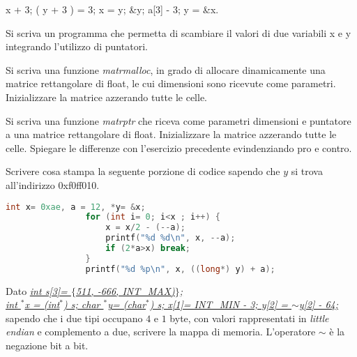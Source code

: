 \documentclass[addpoints,11pt]{exam}
\begin{document}
\begin{questions}
		\begin{oneparcheckboxes}
			\choice x + 3;
			\choice *( y + 3 ) = 3;
			\choice *x = y;
			\choice \&y;
			\choice a[3] - 3;
			\choice y = \&x.
		\end{oneparcheckboxes}
		
		
		
		\question [1]Si scriva un programma che permetta di scambiare il valori di due variabili x e y integrando l'utilizzo di puntatori.
		\makeemptybox{100pt}
		
		
		
		\question[2] Si scriva una funzione \emph{matrmalloc}, in grado di allocare dinamicamente una matrice rettangolare di float, le cui dimensioni sono ricevute come parametri. Inizializzare la matrice azzerando tutte le celle.
		\makeemptybox{100pt}
		
		
		
		\question[4] Si scriva una funzione \emph{matrptr} che riceva come parametri dimensioni e puntatore a una matrice rettangolare di float. Inizializzare la matrice azzerando tutte le celle. Spiegare le differenze con l'esercizio precedente evindenziando pro e contro.
		\makeemptybox{125pt}
		
		
		
		\question[4]
		Scrivere cosa stampa la seguente porzione di codice sapendo che $y$ si trova all'indirizzo 0xf0ff010.
		
		\begin{minipage}[t]{0.5\linewidth}
			\begin{lstlisting}[language=C]
				int x= 0xae, a = 12, *y= &x;
				for (int i= 0; i<x ; i++) {
					x = x/2 - (--a);
					printf("%d %d\n", x, --a);
					if (2*a>x) break;
				}
				printf("%d %p\n", x, ((long*) y) + a);
			\end{lstlisting}
		\end{minipage}
		\begin{minipage}[t]{0.5\linewidth}
			\makeemptybox{100pt}
		\end{minipage}
		
		
		
		\question[4]
		Dato \underline{\emph{int s[3]= $\{$511, -666, INT\_MAX)$\}$;}}\\
		\underline{\emph{int  $^*$x = (int$^*$) s;
				char $^*$y= (char$^*$) s;
				x[1]= INT\_MIN - 3; y[2] = $\sim$y[2] - 64;}}  
		sapendo che i due tipi occupano $4$ e $1$ byte, con valori rappresentati in \emph{little endian} e complemento a due, scrivere la mappa di memoria. L'operatore $\sim$ è la negazione bit a bit.
	\end{questions}
	
\end{document}

